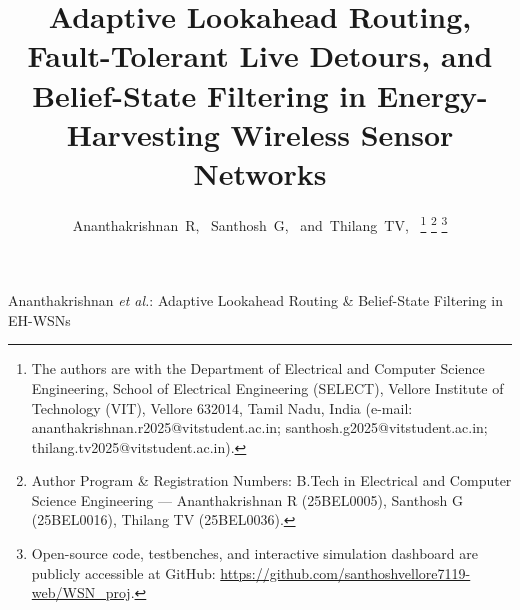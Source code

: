 \documentclass[journal]{IEEEtran}
\begin{document}
\title{Adaptive Lookahead Routing, Fault-Tolerant Live Detours, and Belief-State Filtering in Energy-Harvesting Wireless Sensor Networks}

\author{Ananthakrishnan~R,~
        Santhosh~G,~
        and~Thilang~TV,~%
\thanks{The authors are with the Department of Electrical and Computer Science Engineering, School of Electrical Engineering (SELECT), Vellore Institute of Technology (VIT), Vellore 632014, Tamil Nadu, India (e-mail: ananthakrishnan.r2025@vitstudent.ac.in; santhosh.g2025@vitstudent.ac.in; thilang.tv2025@vitstudent.ac.in).}%
\thanks{Author Program \& Registration Numbers: B.Tech in Electrical and Computer Science Engineering --- Ananthakrishnan R (25BEL0005), Santhosh G (25BEL0016), Thilang TV (25BEL0036).}%
\thanks{Open-source code, testbenches, and interactive simulation dashboard are publicly accessible at GitHub: \url{https://github.com/santhoshvellore7119-web/WSN_proj}.}%
}

%
{Ananthakrishnan \MakeLowercase{\textit{et al.}}: Adaptive Lookahead Routing \& Belief-State Filtering in EH-WSNs}

\maketitle
\end{document}
